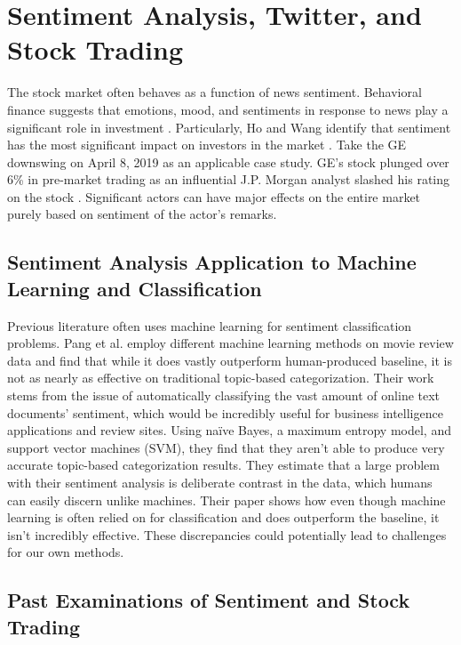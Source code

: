 \documentclass[../thesis.tex]{subfiles}
\begin{document}
\section{Sentiment Analysis, Twitter, and Stock Trading}

The stock market often behaves as a function of news sentiment. Behavioral finance suggests that emotions, mood, and sentiments in response to news play a significant role in investment \cite{Ho2016}. Particularly, Ho and Wang identify that sentiment has the most significant impact on investors in the market \cite{Ho2016}. Take the GE downswing on April 8, 2019 as an applicable case study. GE's stock plunged over 6\% in pre-market trading as an influential J.P. Morgan analyst slashed his rating on the stock \cite{Sozzi2019}. Significant actors can have major effects on the entire market purely based on sentiment of the actor's remarks.

\subsection{Sentiment Analysis Application to Machine Learning and Classification}

Previous literature often uses machine learning for sentiment classification problems. Pang et al. \cite{Pang} employ different machine learning methods on movie review data and find that while it does vastly outperform human-produced baseline, it is not as nearly as effective on traditional topic-based categorization. Their work stems from the issue of automatically classifying the vast amount of online text documents' sentiment, which would be incredibly useful for business intelligence applications and review sites. Using na\"{i}ve Bayes, a maximum entropy model, and support vector machines (SVM), they find that they aren't able to produce very accurate topic-based categorization results. They estimate that a large problem with their sentiment analysis is deliberate contrast in the data, which humans can easily discern unlike machines. Their paper shows how even though machine learning is often relied on for classification and does outperform the baseline, it isn't incredibly effective. These discrepancies could potentially lead to challenges for our own methods. 


\subsection{Past Examinations of Sentiment and Stock Trading}
\end{document}
